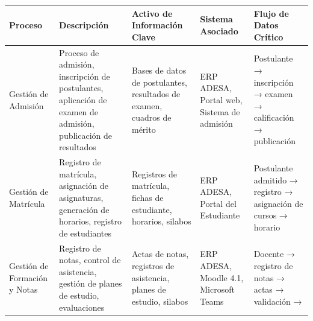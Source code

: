 \documentclass[10pt,letterpaper]{article}
\begin{document}
{\setlength{\RaggedRightRightskip}{0pt plus 5em}\small\sloppy \begin{longtable}[]{@{}
  >{\hspace{0pt}\RaggedRight\arraybackslash}p{}
  >{\hspace{0pt}\RaggedRight\arraybackslash}p{}
  >{\hspace{0pt}\RaggedRight\arraybackslash}p{}
  >{\hspace{0pt}\RaggedRight\arraybackslash}p{}
  >{\hspace{0pt}\RaggedRight\arraybackslash}p{}@{}}
\toprule\noalign{}
\begin{minipage}[b]{\linewidth}\raggedright
Proceso
\end{minipage} & \begin{minipage}[b]{\linewidth}\raggedright
Descripción
\end{minipage} & \begin{minipage}[b]{\linewidth}\raggedright
Activo de Información Clave
\end{minipage} & \begin{minipage}[b]{\linewidth}\raggedright
Sistema Asociado
\end{minipage} & \begin{minipage}[b]{\linewidth}\raggedright
Flujo de Datos Crítico
\end{minipage} \\
\midrule\noalign{}
\endhead
\bottomrule\noalign{}
\endlastfoot
Gestión de Admisión & Proceso de admisión, inscripción de postulantes,
aplicación de examen de admisión, publicación de resultados & Bases de
datos de postulantes, resultados de examen, cuadros de mérito & ERP
ADESA, Portal web, Sistema de admisión & Postulante → inscripción →
examen → calificación → publicación \\
Gestión de Matrícula & Registro de matrícula, asignación de asignaturas,
generación de horarios, registro de estudiantes & Registros de
matrícula, fichas de estudiante, horarios, silabos & ERP ADESA, Portal
del Estudiante & Postulante admitido → registro → asignación de cursos →
horario \\
Gestión de Formación y Notas & Registro de notas, control de asistencia,
gestión de planes de estudio, evaluaciones & Actas de notas, registros
de asistencia, planes de estudio, silabos & ERP ADESA, Moodle 4.1,
Microsoft Teams & Docente → registro de notas → actas → validación →

\end{longtable}}
\end{document}
